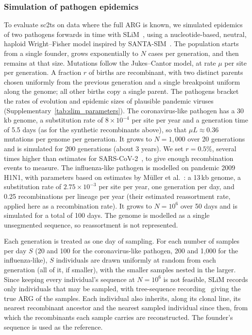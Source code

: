 \documentclass[12pt]{article}
\newcommand{\siref}[1]{Supplementary~\ref{#1}}
\begin{document}
\subsubsection*{Simulation of pathogen epidemics}
To evaluate sc2ts on data where the full ARG is known,
we simulated epidemics of two pathogens forwards in time with
SLiM~\cite{Haller2026slim}, using a nucleotide-based, neutral, haploid
Wright--Fisher model inspired by SANTA-SIM~\cite{Jariani2019santa}.
The population starts from a single founder, grows exponentially to
$N$ cases per generation, and then remains at that size.
Mutations follow the Jukes--Cantor model, at rate $\mu$ per site per generation.
A fraction $r$ of births are recombinant, with two distinct parents
chosen uniformly from the previous generation
and a single breakpoint uniform along the genome;
all other births copy a single parent.
The pathogens bracket the rates of evolution and epidemic sizes of plausible
pandemic viruses (\siref{tab:slim_parameters}). The coronavirus-like pathogen
has a 30\,kb genome, a substitution rate of $8\times10^{-4}$ per site per year
and a generation time of 5.5 days
(as for the synthetic recombinants above),
so that $\mu L \approx 0.36$ mutations per genome per generation.
It grows to $N=1{,}000$ over 20 generations and is simulated for 200
generations (about 3 years).
We set $r=0.5\%$, several times higher than estimates for
SARS-CoV-2~\cite{Muller2022bayesian}, to give enough recombination events to measure.
The influenza-like pathogen is modelled on pandemic 2009 H1N1,
with parameters based on estimates by M\"uller et al.~\cite{Muller2020bayesian}:
a 13\,kb genome, a substitution rate of $2.75\times10^{-3}$ per site per year,
one generation per day, and 0.25 recombinations per lineage per year
(their estimated reassortment rate, applied here as a recombination rate).
It grows to $N=10^6$ over 50 days and is simulated for a total of 100 days.
The genome is modelled as a single unsegmented sequence,
so reassortment is not represented.

Each generation is treated as one day of sampling.
For each number of samples per day $S$
(20 and 100 for the coronavirus-like pathogen, 200 and 1,000 for the influenza-like),
$S$ individuals are drawn uniformly at random from each generation
(all of it, if smaller), with the smaller samples nested in the larger.
Since keeping every individual's sequence at $N=10^6$ is not feasible,
SLiM records only individuals that may be sampled, with tree-sequence
recording~\cite{Kelleher2018efficient,Haller2019tree} giving the true ARG
of the samples.
Each individual also inherits, along its clonal line,
its nearest recombinant ancestor and the nearest sampled individual since then,
from which the recombinants each sample carries are reconstructed.
The founder's sequence is used as the reference.
\end{document}
